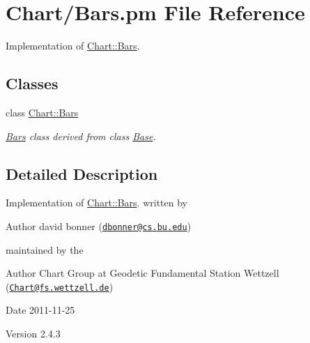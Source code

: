 \hypertarget{Bars_8pm}{
\section{Chart/Bars.pm File Reference}
\label{Bars_8pm}
}


Implementation of \hyperlink{classChart_1_1Bars}{Chart::Bars}.  


\subsection*{Classes}
\begin{DoxyCompactItemize}
\item 
class \hyperlink{classChart_1_1Bars}{Chart::Bars}
\begin{DoxyCompactList}\small\item\em \hyperlink{classChart_1_1Bars}{Bars} class derived from class \hyperlink{classChart_1_1Base}{Base}. \item\end{DoxyCompactList}\end{DoxyCompactItemize}


\subsection{Detailed Description}
Implementation of \hyperlink{classChart_1_1Bars}{Chart::Bars}. written by \begin{DoxyAuthor}{Author}
david bonner (\href{mailto:dbonner@cs.bu.edu}{\tt dbonner@cs.bu.edu})
\end{DoxyAuthor}
maintained by the \begin{DoxyAuthor}{Author}
Chart Group at Geodetic Fundamental Station Wettzell (\href{mailto:Chart@fs.wettzell.de}{\tt Chart@fs.wettzell.de}) 
\end{DoxyAuthor}
\begin{DoxyDate}{Date}
2011-\/11-\/25 
\end{DoxyDate}
\begin{DoxyVersion}{Version}
2.4.3 
\end{DoxyVersion}
